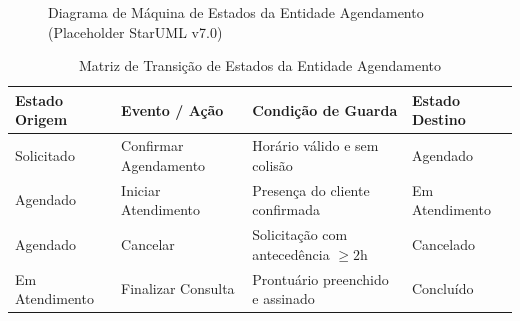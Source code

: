 \begin{figure}[htbp]
    \centering
    \caption{Diagrama de Máquina de Estados da Entidade Agendamento (Placeholder StarUML v7.0)}
    \label{fig:dsm_agendamento}
\end{figure}

\begin{table}[htbp]
\caption{Matriz de Transição de Estados da Entidade Agendamento}
\label{tab:transicao_estados}
\centering
\small
\begin{tabularx}{\textwidth}{@{} l Y Y l @{}}
\toprule
\textbf{Estado Origem} & \textbf{Evento / Ação} & \textbf{Condição de Guarda} & \textbf{Estado Destino} \\
\midrule
Solicitado & Confirmar Agendamento & Horário válido e sem colisão & Agendado \\
Agendado & Iniciar Atendimento & Presença do cliente confirmada & Em Atendimento \\
Agendado & Cancelar & Solicitação com antecedência $\ge 2$h & Cancelado \\
Em Atendimento & Finalizar Consulta & Prontuário preenchido e assinado & Concluído \\
\bottomrule
\end{tabularx}
\end{table}

